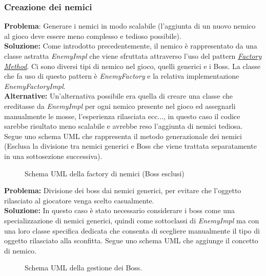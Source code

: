 \documentclass[a4paper,12pt]{report}
\begin{document}
\subsubsection{Creazione dei nemici}
\textbf{Problema}: Generare i nemici in modo scalabile (l'aggiunta di un nuovo nemico al gioco deve essere meno complesso e tedioso possibile).\\
\textbf{Soluzione:} Come introdotto precedentemente, il nemico è rappresentato da una classe astratta \textit{EnemyImpl} che viene sfruttata attraverso l'uso del pattern \href{https://refactoring.guru/design-patterns/factory-method}{\textit{Factory Method}}.
Ci sono diversi tipi di nemico nel gioco, quelli generici e i Boss. La classe che fa uso di questo pattern è \textit{EnemyFactory} e la relativa implementazione \textit{EnemyFactoryImpl}.\\ \textbf{Alternative:} Un'alternativa possibile era quella di creare una classe che ereditasse da \textit{EnemyImpl} per ogni nemico presente nel gioco ed assegnarli manualmente le mosse, l'esperienza rilasciata ecc..., in questo caso il codice sarebbe risultato meno scalabile e avrebbe reso l'aggiunta di nemici tediosa.\\
Segue uno schema UML che rappresenta il metodo generazionale dei nemici (Esclusa la divisione tra nemici generici e Boss che viene trattata separatamente in una sottosezione successiva).

\begin{figure}[H]
	\centering
	
	\caption{Schema UML della factory di nemici (Boss esclusi)}
	\label{fig:Schema UML della factory di nemici}
\end{figure}

\textbf{Problema:} Divisione dei boss dai nemici generici, per evitare che l'oggetto rilasciato al giocatore venga scelto casualmente.\\
\textbf{Soluzione:} In questo caso è stato necessario considerare i boss come una specializzazione di nemici generici, quindi come sottoclassi di \textit{EnemyImpl} ma con una loro classe specifica dedicata che consenta di scegliere manualmente il tipo di oggetto rilasciato alla sconfitta. Segue uno schema UML che aggiunge il concetto di nemico.

\begin{figure}[H]
	\centering
	
	\caption{Schema UML della gestione dei Boss.}
	\label{fig:Schema UML della gestione dei boss.}
\end{figure}
\end{document}
